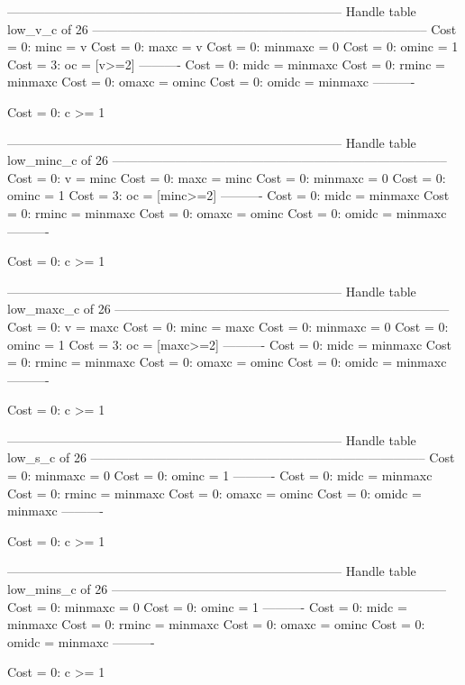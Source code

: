 --------------------------------------------------------------------------------
Handle table low_v_c of 26
--------------------------------------------------------------------------------
Cost =  0:  minc    = v
Cost =  0:  maxc    = v
Cost =  0:  minmaxc = 0
Cost =  0:  ominc   = 1
Cost =  3:  oc      = [v>=2]
----------
Cost =  0:  midc    = minmaxc
Cost =  0:  rminc   = minmaxc
Cost =  0:  omaxc   = ominc
Cost =  0:  omidc   = minmaxc
----------

Cost =  0:  c >= 1

--------------------------------------------------------------------------------
Handle table low_minc_c of 26
--------------------------------------------------------------------------------
Cost =  0:  v       = minc
Cost =  0:  maxc    = minc
Cost =  0:  minmaxc = 0
Cost =  0:  ominc   = 1
Cost =  3:  oc      = [minc>=2]
----------
Cost =  0:  midc    = minmaxc
Cost =  0:  rminc   = minmaxc
Cost =  0:  omaxc   = ominc
Cost =  0:  omidc   = minmaxc
----------

Cost =  0:  c >= 1

--------------------------------------------------------------------------------
Handle table low_maxc_c of 26
--------------------------------------------------------------------------------
Cost =  0:  v       = maxc
Cost =  0:  minc    = maxc
Cost =  0:  minmaxc = 0
Cost =  0:  ominc   = 1
Cost =  3:  oc      = [maxc>=2]
----------
Cost =  0:  midc    = minmaxc
Cost =  0:  rminc   = minmaxc
Cost =  0:  omaxc   = ominc
Cost =  0:  omidc   = minmaxc
----------

Cost =  0:  c >= 1

--------------------------------------------------------------------------------
Handle table low_s_c of 26
--------------------------------------------------------------------------------
Cost =  0:  minmaxc = 0
Cost =  0:  ominc   = 1
----------
Cost =  0:  midc    = minmaxc
Cost =  0:  rminc   = minmaxc
Cost =  0:  omaxc   = ominc
Cost =  0:  omidc   = minmaxc
----------

Cost =  0:  c >= 1

--------------------------------------------------------------------------------
Handle table low_mins_c of 26
--------------------------------------------------------------------------------
Cost =  0:  minmaxc = 0
Cost =  0:  ominc   = 1
----------
Cost =  0:  midc    = minmaxc
Cost =  0:  rminc   = minmaxc
Cost =  0:  omaxc   = ominc
Cost =  0:  omidc   = minmaxc
----------

Cost =  0:  c >= 1

